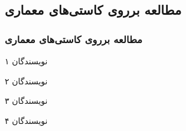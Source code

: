 \label{studies_on_architectural_problems}

\subsection{مطالعه برروی کاستی‌های معماری}
\begin{frame}
\frametitle{مطالعه برروی کاستی‌های معماری}

\begin{block}{نویسندگان ۱}
\end{block}

\begin{block}{نویسندگان ۲}
\end{block}

\begin{block}{نویسندگان ۳}
\end{block}

\begin{block}{نویسندگان ۴}
\end{block}

\end{frame}
